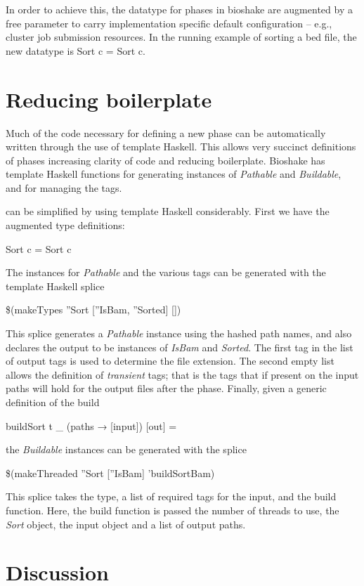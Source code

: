 \documentclass{article}
\begin{document}
In order to achieve this, the datatype for phases in bioshake are augmented by a
free parameter to carry implementation specific default configuration -- e.g., cluster
job submission resources. In the running example of sorting a bed file, the new
datatype is \<  Sort c = Sort c\>.

\section{Reducing boilerplate}

Much of the code necessary for defining a new phase can be automatically written
through the use of template Haskell. This allows very succinct definitions of
phases increasing clarity of code and reducing boilerplate. Bioshake has
template Haskell functions for generating instances of \textit{Pathable} and
\textit{Buildable}, and for managing the tags.

\begin{example}
   can be simplified by using template Haskell considerably. First
  we have the augmented type definitions:
  \begin{haskell*}
     Sort c = Sort c
  \end{haskell*}
  The instances for \textit{Pathable} and the various tags can be generated with
  the template Haskell splice
  \begin{haskell*}
    \$(makeTypes ''\!Sort [''\!IsBam, ''\!Sorted] [])
  \end{haskell*}
  This splice generates a \textit{Pathable} instance using the hashed path
  names, and also declares the output to be instances of \textit{IsBam} and
  \textit{Sorted}. The first tag in the list of output tags is used to determine
  the file extension. The second empty list allows the definition of
  \textit{transient} tags; that is the tags that if present on the input paths will
  hold for the output files after the phase.
  Finally, given a generic definition of the build
  \begin{haskell*}
    buildSort t \_ (paths → [input]) [out] = 
  \end{haskell*}
  the \textit{Buildable} instances can be generated with the splice
  \begin{haskell*}
    \$(makeThreaded ''\!Sort [''\!IsBam] '\!buildSortBam)
  \end{haskell*}
  This splice takes the type, a list of required tags for the input, and the
  build function. Here, the build function is passed the number of threads to
  use, the \textit{Sort} object, the input object and a list of output paths.

\end{example}

\section{Discussion}
\end{document}
